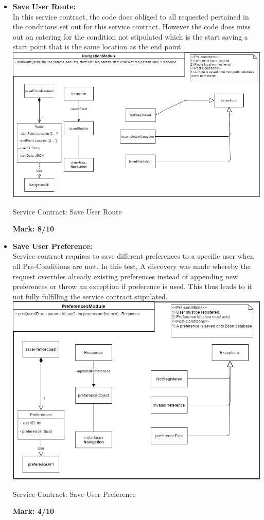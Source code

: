 \begin{itemize}
	
\item \textbf{Save User Route:}\\In this service contract, the code does obliged to all requested pertained in the conditions set out for this service contract. However the code does miss out on catering for the condition not stipulated which is the start saving a start point that is the same location as the end point.\\
\includegraphics[scale=0.5]{SaveRoute.png}
\caption{Service Contract: Save User Route}
	\textbf{Mark: 8/10}
	
\item \textbf{Save User Preference:}\\Service contract requires to save different preferences to a specific user when all Pre-Conditions are met. In this test, A discovery was made whereby the request overrides already existing preferences instead of appending new preferences or throw an exception if preference is used. This thus leads to it not fully fulfilling the service contract stipulated.\\
\includegraphics[scale=0.5]{SPrefServiceContract.png}
\caption{Service Contract: Save User Preference}
	\textbf{Mark: 4/10}
	

\end{itemize}
